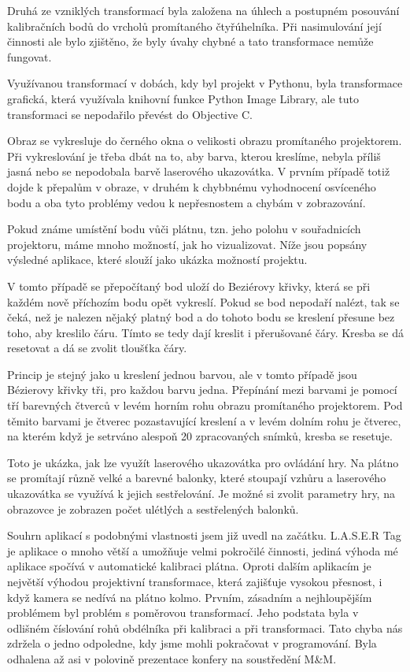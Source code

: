\documentclass[twoside,12pt]{article}
\begin{document}
Druhá ze vzniklých transformací byla založena na úhlech a postupném posouvání kalibračních bodů do vrcholů promítaného čtyřúhelníka. Při nasimulování její činnosti ale bylo zjištěno, že byly úvahy chybné a tato transformace nemůže fungovat.

Využívanou transformací v dobách, kdy byl projekt v Pythonu, byla transformace grafická, která využívala knihovní funkce Python Image Library, ale tuto transformaci se nepodařilo převést do Objective C.

Obraz se vykresluje do černého okna o velikosti obrazu promítaného projektorem. Při vykreslování je třeba dbát na to, aby barva, kterou kreslíme, nebyla příliš jasná nebo se nepodobala barvě laserového ukazovátka. V prvním případě totiž dojde k přepalům v obraze, v druhém k chybbnému vyhodnocení osvíceného bodu a oba tyto problémy vedou k nepřesnostem a chybám v zobrazování.


Pokud známe umístění bodu vůči plátnu, tzn. jeho polohu v souřadnicích projektoru, máme mnoho možností, jak ho vizualizovat. Níže jsou popsány výsledné aplikace, které slouží jako ukázka možností projektu.

V tomto případě se přepočítaný bod uloží do Beziérovy křivky, která se při každém nově příchozím bodu opět vykreslí. Pokud se bod nepodaří nalézt, tak se čeká, než je nalezen nějaký platný bod a do tohoto bodu se kreslení přesune bez toho, aby kreslilo čáru. Tímto se tedy dají kreslit i přerušované čáry. Kresba se dá resetovat a dá se zvolit tloušťka čáry.

Princip je stejný jako u kreslení jednou barvou, ale v tomto případě jsou Bézierovy křivky tři, pro každou barvu jedna. Přepínání mezi barvami je pomocí tří barevných čtverců v levém horním rohu obrazu promítaného projektorem. Pod těmito barvami je čtverec pozastavující kreslení a v levém dolním rohu je čtverec, na kterém když je setrváno alespoň 20 zpracovaných snímků, kresba se resetuje.

Toto je ukázka, jak lze využít laserového ukazovátka pro ovládání hry. Na plátno se promítají různě velké a barevné balonky, které stoupají vzhůru a laserového ukazovátka se využívá k jejich sestřelování. Je možné si zvolit parametry hry, na obrazovce je zobrazen počet ulétlých a sestřelených balonků.

Souhrn aplikací s podobnými vlastnosti jsem již uvedl na začátku. L.A.S.E.R Tag je aplikace o mnoho větší a umožňuje velmi pokročilé činnosti, jediná výhoda mé aplikace spočívá v automatické kalibraci plátna. Oproti dalším aplikacím je největší výhodou projektivní transformace, která zajišťuje vysokou přesnost, i když kamera se nedívá na plátno kolmo.
Prvním, zásadním a nejhloupějším problémem byl problém s poměrovou transformací. Jeho podstata byla v odlišném číslování rohů obdélníka při kalibraci a při transformaci. Tato chyba nás zdržela o jedno odpoledne, kdy jsme mohli pokračovat v programování. Byla odhalena až asi v polovině prezentace konfery na soustředění M\&M. 
\end{document}
